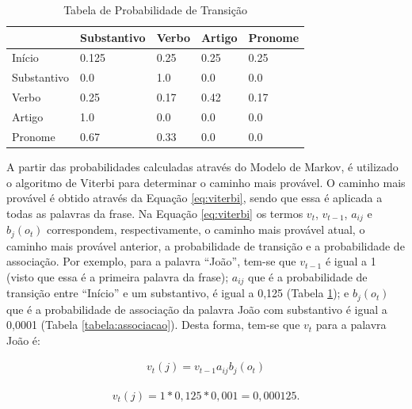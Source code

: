 \begin{table}[htb]
\centering
\begin{tabular}{|l|l|l|l|l|}
\hline
& Substantivo & Verbo & Artigo & Pronome \\ \hline
Início      & 0.125       & 0.25  & 0.25   & 0.25    \\ \hline
Substantivo & 0.0         & 1.0   & 0.0    & 0.0     \\ \hline
Verbo       & 0.25        & 0.17  & 0.42   & 0.17    \\ \hline
Artigo      & 1.0         & 0.0   & 0.0    & 0.0     \\ \hline
Pronome     & 0.67        & 0.33  & 0.0    & 0.0     \\ \hline
\end{tabular}
\caption{Tabela de Probabilidade de Transição}
\label{tabela:transicao}
\end{table}

A partir das probabilidades calculadas através do Modelo de Markov, é
utilizado o algoritmo de Viterbi para determinar o caminho mais provável. O
caminho mais provável é obtido através da Equação \ref{eq:viterbi}, sendo que
essa é aplicada a todas as palavras da frase. Na Equação \ref{eq:viterbi} os
termos $v_t$, $v_{t-1}$, $a_{ij}$ e $b_j(o_t)$ correspondem, respectivamente, o
caminho mais provável atual, o caminho mais provável anterior, a probabilidade
de transição e a probabilidade de associação.
Por exemplo, para a palavra ``João'', tem-se que $v_{t-1}$ é igual a
1 (visto que essa é a primeira palavra
da frase);
$a_{ij}$ que é a probabilidade de transição entre ``Início'' e um substantivo, é
igual a 0,125 (Tabela \ref{tabela:transicao}); e $b_j(o_t)$ que é a
probabilidade de associação da palavra João com substantivo é igual a 0,0001 (Tabela
\ref{tabela:associacao}).
Desta forma, tem-se que $v_t$ para a palavra João é:

\begin{equation}
\begin{split}
v_t(j) = v_{t-1} a_{ij} b_j(o_t)
\end{split}
\label{eq:viterbi}
\end{equation}



\begin{equation}
\begin{split}
v_t(j) = 1 * 0,125 * 0,001 = 0,000125.
\end{split}
\label{eq:joao}
\end{equation}

